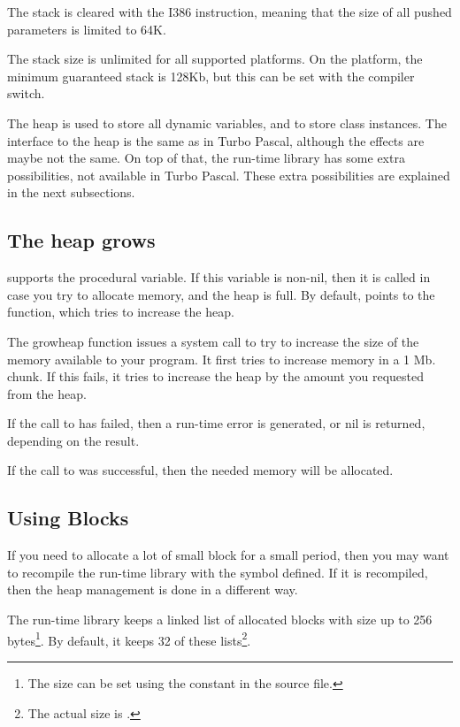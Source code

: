 \documentclass{report}
\begin{document}
The stack is cleared with the  I386 instruction, meaning that the
size of all pushed parameters is limited to 64K.

The stack size is unlimited for all supported platforms. On the 
platform, the minimum guaranteed stack is 128Kb, but this can be set with
the  compiler switch. 

The heap is used to store all dynamic variables, and to store class
instances. The interface to the heap is the same as in Turbo Pascal,
although the effects are maybe not the same. On top of that, the \fpc
run-time library has some extra possibilities, not available in Turbo
Pascal. These extra possibilities are explained in the next subsections.

\subsection{The heap grows}
\fpc supports the  procedural variable. If this variable is
non-nil, then it is called in case you try to allocate memory, and the heap
is full. By default,  points to the  function, 
which tries to increase the heap.

The growheap function issues a system call to try to increase the size of the
memory available to your program. It first tries to increase memory in a 1 Mb.
chunk. If this fails, it tries to increase the heap by the amount you
requested from the heap. 

If the call to  has failed, then a run-time error is generated, 
or nil is returned, depending on the  result.

If the call to  was successful, then the needed memory will be
allocated.
  
\subsection{Using Blocks}
If you need to allocate a lot of small block for a small period, then you
may want to recompile the run-time library with the  symbol 
defined. If it is recompiled, then the heap management is done in a
different way.

The run-time library keeps a linked list of allocated blocks with size
up to 256 bytes\footnote{The size can be set using the 
constant in the  source file.}. By default, it keeps 32 of 
these lists\footnote{The actual size is .}.
\end{document}
